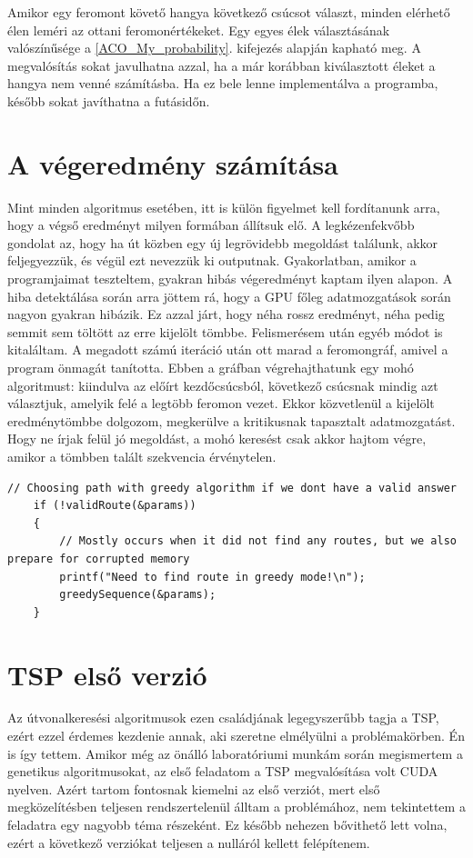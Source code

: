 Amikor egy feromont követő hangya következő csúcsot választ, minden elérhető élen leméri az ottani feromonértékeket. Egy egyes élek választásának valószínűsége a \ref{ACO_My_probability}. kifejezés alapján kapható meg. A megvalósítás sokat javulhatna azzal, ha a már korábban kiválasztott éleket a hangya nem venné számításba. Ha ez bele lenne implementálva a programba, később sokat javíthatna a futásidőn.

\section{A végeredmény számítása}
\label{sec:getResult}
Mint minden algoritmus esetében, itt is külön figyelmet kell fordítanunk arra, hogy a végső eredményt milyen formában állítsuk elő. A legkézenfekvőbb gondolat az, hogy ha út közben egy új legrövidebb megoldást találunk, akkor feljegyezzük, és végül ezt nevezzük ki outputnak. Gyakorlatban, amikor a programjaimat teszteltem, gyakran hibás végeredményt kaptam ilyen alapon. A hiba detektálása során arra jöttem rá, hogy a GPU főleg adatmozgatások során nagyon gyakran hibázik. Ez azzal járt, hogy néha rossz eredményt, néha pedig semmit sem töltött az erre kijelölt tömbbe. Felismerésem után egyéb módot is kitaláltam. A megadott számú iteráció után ott marad a feromongráf, amivel a program önmagát tanította. Ebben a gráfban végrehajthatunk egy mohó algoritmust: kiindulva az előírt kezdőcsúcsból, következő csúcsnak mindig azt választjuk, amelyik felé a legtöbb feromon vezet. Ekkor közvetlenül a kijelölt eredménytömbbe dolgozom, megkerülve a kritikusnak tapasztalt adatmozgatást. Hogy ne írjak felül jó megoldást, a mohó keresést csak akkor hajtom végre, amikor a tömbben talált szekvencia érvénytelen.

\begin{lstlisting}[style=CStyle,showstringspaces=false]
	// Choosing path with greedy algorithm if we dont have a valid answer
	if (!validRoute(&params)) 
	{
		// Mostly occurs when it did not find any routes, but we also prepare for corrupted memory
		printf("Need to find route in greedy mode!\n");
		greedySequence(&params);
	}
\end{lstlisting}


\section{TSP első verzió} \label{TSP_v1_SubSection}
Az útvonalkeresési algoritmusok ezen családjának legegyszerűbb tagja a TSP, ezért ezzel érdemes kezdenie annak, aki szeretne elmélyülni a problémakörben. Én is így tettem. Amikor még az önálló laboratóriumi munkám során megismertem a genetikus algoritmusokat, az első feladatom a TSP megvalósítása volt CUDA nyelven. Azért tartom fontosnak kiemelni az első verziót, mert első megközelítésben teljesen rendszertelenül álltam a problémához, nem tekintettem a feladatra egy nagyobb téma részeként. Ez később nehezen bővithető lett volna, ezért a következő verziókat teljesen a nulláról kellett felépítenem.

